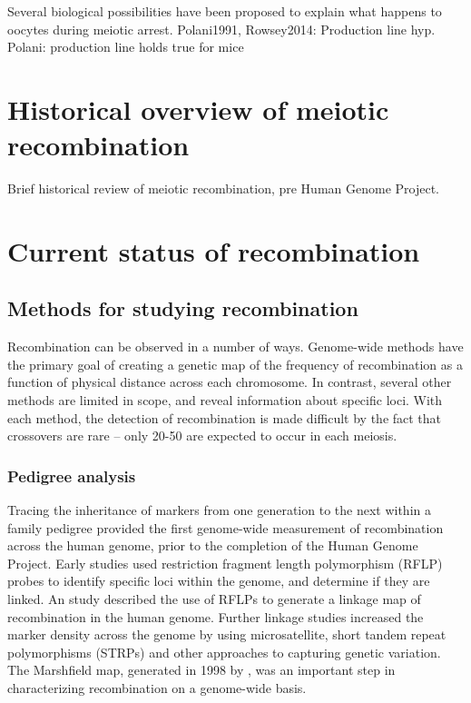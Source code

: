 Several biological possibilities have been proposed to explain what happens to oocytes during meiotic arrest.
Polani1991, Rowsey2014: Production line hyp.
Polani: production line holds true for mice



\section{Historical overview of meiotic recombination}

Brief historical review of meiotic recombination, pre Human Genome Project.

\section{Current status of recombination}

\subsection{Methods for studying recombination}

Recombination can be observed in a number of ways.
Genome-wide methods have the primary goal of creating a genetic map of the frequency of recombination as a function of physical distance across each chromosome.
In contrast, several other methods are limited in scope, and reveal information about specific loci.
With each method, the detection of recombination is made difficult by the fact that crossovers are rare -- only 20-50 are expected to occur in each meiosis.

\subsubsection{Pedigree analysis}

Tracing the inheritance of markers from one generation to the next within a family pedigree provided the first genome-wide measurement of recombination across the human genome, prior to the completion of the Human Genome Project.
Early studies used restriction fragment length polymorphism (RFLP) probes to identify specific loci within the genome, and determine if they are linked.
An study described the use of RFLPs to generate a linkage map of recombination in the human genome\cite{Botstein1980}.
Further linkage studies increased the marker density across the genome by using microsatellite, short tandem repeat polymorphisms (STRPs) and other approaches to capturing genetic variation\cite{Morton1991,Matise1994,Dib1996}.
The Marshfield map, generated in 1998 by \citet{Broman1998}, was an important step in characterizing recombination on a genome-wide basis.

